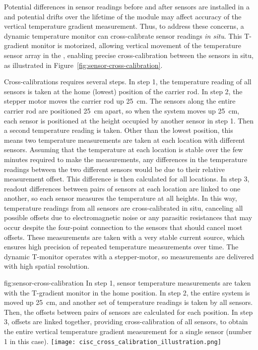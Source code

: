  Potential differences in sensor readings before and after sensors are installed in a  and potential drifts over the lifetime of the %
 module may affect accuracy of the vertical temperature gradient measurement. Thus, to address these concerns, %
 a dynamic temperature monitor can cross-calibrate  sensor readings %
 \textit{in situ}.
This T-gradient monitor is motorized, allowing vertical movement of the temperature sensor array %
in the , %
enabling precise cross-calibration between the sensors %
in situ, as illustrated in Figure~\ref{fig:sensor-cross-calibration}.  

Cross-calibrations requires several steps. In step 1, the temperature reading  of all sensors is taken at the home (lowest) position of the carrier rod. In  step 2, the stepper motor moves the carrier rod up \SI{25}{cm}. The sensors along the entire  carrier rod are positioned \SI{25}{cm} apart, so when the system moves up \SI{25}{cm}, each sensor is positioned at the height occupied by another sensor in step 1. Then a second temperature reading is taken. Other than the lowest position, this means two temperature measurements are taken at each location with %
different sensors. Assuming that the temperature at each location is stable over the few minutes required to make the measurements, %
any differences in the temperature readings between the two different sensors would be due to their relative measurement offset. This %
difference is then calculated for all locations.  In step 3, readout differences between pairs of sensors at each location are linked to one another, so each sensor measures the temperature at all heights. In this way, temperature readings from all sensors are cross-calibrated %
in situ, canceling all possible offsets due to electromagnetic noise or any parasitic resistances that may occur despite the four-point connection to the sensors that should cancel most offsets. These measurements are taken with a very stable current source, which ensures high precision of repeated temperature measurements over time. The dynamic T-monitor operates with a stepper-motor, so measurements are delivered with high spatial resolution. 

\begin{dunefigure}{fig:sensor-cross-calibration}
  {In step 1, sensor temperature measurements are taken with the T-gradient monitor in the home position. In step 2, the entire system is moved up \SI{25}{cm}, and another set of temperature readings is taken by all sensors. Then, the offsets between pairs of sensors are calculated for each position. In step 3, offsets are linked together, providing cross-calibration of all sensors, to obtain the entire vertical temperature gradient measurement for a single sensor (number 1 in this case). }
  \texttt{[image: cisc\_cross\_calibration\_illustration.png]}%
\end{dunefigure}



